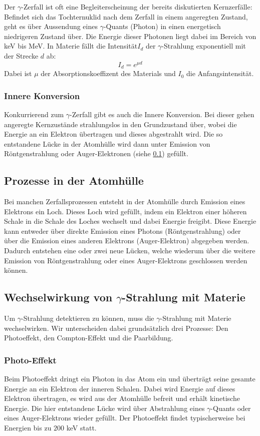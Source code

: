\documentclass[12pt]{article}
\begin{document}
Der $\gamma$-Zerfall ist oft eine Begleiterscheinung der bereits diskutierten Kernzerfälle: Befindet sich das Tochternuklid nach dem Zerfall in einem angeregten Zustand, geht es über Aussendung eines $\gamma$-Quants (Photon)  in einen energetisch niedrigeren Zustand über. Die Energie dieser Photonen liegt dabei im Bereich von keV bis MeV. In Materie fällt die Intensität$I_d$ der $\gamma$-Strahlung exponentiell mit der Strecke $d$ ab:
\[I_d=e^{\mu d}\]
Dabei ist $\mu$ der Absorptionskoeffizent des Materials und $I_0$ die Anfangsintensität.

\subsubsection{Innere Konversion}
Konkurrierend zum $\gamma$-Zerfall gibt es auch die Innere Konversion. Bei dieser gehen angeregte Kernzustände strahlungslos in den Grundzustand über, wobei die Energie an ein Elektron übertragen und dieses abgestrahlt wird. Die so entstandene Lücke in der Atomhülle wird dann unter Emission von Röntgenstrahlung oder Auger-Elektronen (siehe \ref{auger}) gefüllt.

\subsection{Prozesse in der Atomhülle}\label{auger}
Bei manchen Zerfallsprozessen entsteht in der Atomhülle durch Emission eines Elektrons ein Loch. Dieses Loch wird gefüllt, indem ein Elektron einer höheren Schale in die Schale des Loches wechselt und dabei Energie freigibt. Diese Energie kann entweder über direkte Emission eines Photons (Röntgenstrahlung) oder über die Emission eines anderen Elektrons (Auger-Elektron) abgegeben werden. Dadurch entstehen eine oder zwei neue Lücken, welche wiederum über die weitere Emission von Röntgenstrahlung oder eines Auger-Elektrons geschlossen werden können.

\subsection{Wechselwirkung von $\gamma$-Strahlung mit Materie}
Um $\gamma$-Strahlung detektieren zu können, muss die $\gamma$-Strahlung mit Materie wechselwirken. Wir unterscheiden dabei grundsätzlich drei Prozesse: Den Photoeffekt, den Compton-Effekt und die Paarbildung.
 \subsubsection{Photo-Effekt}
 Beim Photoeffekt dringt ein Photon in das Atom ein und überträgt seine gesamte Energie an ein Elektron der inneren Schalen. Dabei wird Energie auf dieses Elektron übertragen, es wird aus der Atomhülle befreit und erhält kinetische Energie. Die hier entstandene Lücke wird über Abstrahlung eines $\gamma$-Quants oder eines Auger-Elektrons wieder gefüllt.
 Der Photoeffekt findet typischerweise bei Energien bis zu $200$ keV statt.
\end{document}
